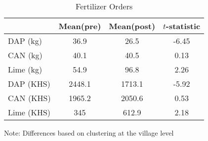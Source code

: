 \begin{table}[htbp]
\centering
\hspace*{-1.2cm}
\begin{threeparttable}
\caption{Fertilizer Orders}
\label{tab:fertorder}
\begin{tabular}{l ccc}
\hline
\hline
            &   Mean(pre)&  Mean(post)&$t$-statistic\\
\hline
DAP (kg)    &        36.9&        26.5&       -6.45\\
%
%
%
CAN (kg)    &        40.1&        40.5&        0.13\\
%
%
%
Lime (kg)   &        54.9&        96.8&        2.26\\
\hline
%
%
DAP (KHS)   &      2448.1&      1713.1&       -5.92\\
%
%
%
CAN (KHS)   &      1965.2&      2050.6&        0.53\\
%
%
%
Lime (KHS)  &         345&       612.9&        2.18\\
\hline
\hline
\end{tabular}
\begin{tablenotes}
\footnotesize
\item{Note: Differences based on clustering at the village level}
\end{tablenotes}
\end{threeparttable}
\end{table}
